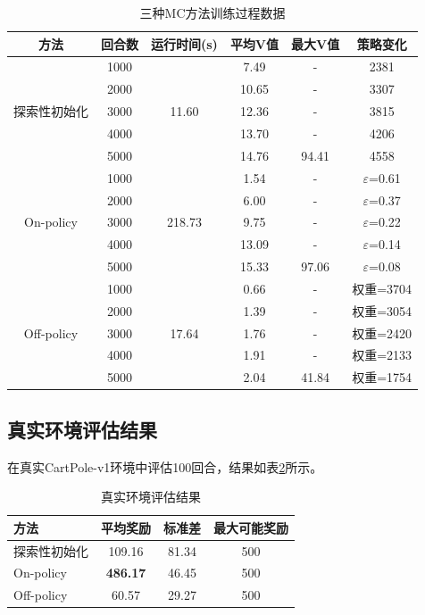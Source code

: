 \documentclass[12pt,a4paper]{article}
\begin{document}
\begin{table}[H]
\centering
\caption{三种MC方法训练过程数据}
\label{tab:training}
\begin{tabular}{cccccc}
\toprule
\textbf{方法} & \textbf{回合数} & \textbf{运行时间(s)} & \textbf{平均V值} & \textbf{最大V值} & \textbf{策略变化} \\
\midrule
\multirow{5}{*}{探索性初始化} & 1000 & \multirow{5}{*}{11.60} & 7.49 & - & 2381 \\
 & 2000 &  & 10.65 & - & 3307 \\
 & 3000 &  & 12.36 & - & 3815 \\
 & 4000 &  & 13.70 & - & 4206 \\
 & 5000 &  & 14.76 & 94.41 & 4558 \\
\midrule
\multirow{5}{*}{On-policy} & 1000 & \multirow{5}{*}{218.73} & 1.54 & - & $\varepsilon$=0.61 \\
 & 2000 &  & 6.00 & - & $\varepsilon$=0.37 \\
 & 3000 &  & 9.75 & - & $\varepsilon$=0.22 \\
 & 4000 &  & 13.09 & - & $\varepsilon$=0.14 \\
 & 5000 &  & 15.33 & 97.06 & $\varepsilon$=0.08 \\
\midrule
\multirow{5}{*}{Off-policy} & 1000 & \multirow{5}{*}{17.64} & 0.66 & - & 权重=3704 \\
 & 2000 &  & 1.39 & - & 权重=3054 \\
 & 3000 &  & 1.76 & - & 权重=2420 \\
 & 4000 &  & 1.91 & - & 权重=2133 \\
 & 5000 &  & 2.04 & 41.84 & 权重=1754 \\
\bottomrule
\end{tabular}
\end{table}

\subsection{真实环境评估结果}

在真实CartPole-v1环境中评估100回合，结果如表\ref{tab:evaluation}所示。

\begin{table}[H]
\centering
\caption{真实环境评估结果}
\label{tab:evaluation}
\begin{tabular}{lccc}
\toprule
\textbf{方法} & \textbf{平均奖励} & \textbf{标准差} & \textbf{最大可能奖励} \\
\midrule
探索性初始化 & 109.16 & 81.34 & 500 \\
On-policy & \textbf{486.17} & 46.45 & 500 \\
Off-policy & 60.57 & 29.27 & 500 \\
\bottomrule
\end{tabular}
\end{table}
\end{document}
